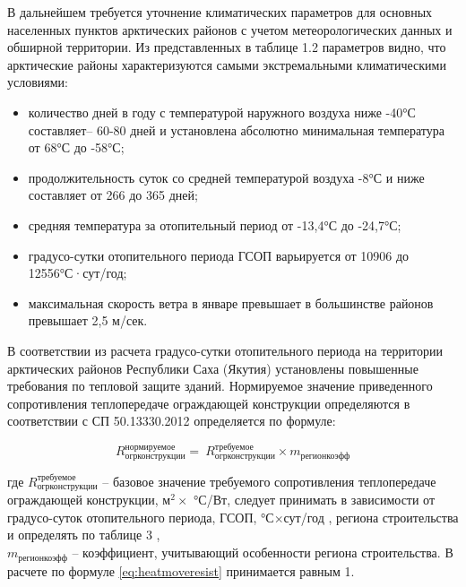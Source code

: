 В дальнейшем требуется уточнение климатических параметров для основных населенных пунктов арктических районов с учетом метеорологических данных и обширной территории.
Из представленных в таблице 1.2 параметров видно, что арктические районы характеризуются самыми экстремальными климатическими условиями:
\begin{itemize}
    \item количество дней в году с температурой наружного воздуха ниже -40°С составляет– 60-80 дней и установлена абсолютно минимальная температура от 68°С до -58°С;  
    \item продолжительность суток со средней температурой воздуха -8°С и ниже составляет от 266 до 365 дней;
    \item средняя температура за отопительный период от -13,4°С до -24,7°С;
    \item градусо-сутки отопительного периода ГСОП варьируется от 10906 до 12556°С·сут/год;
    \item максимальная скорость ветра в январе превышает в большинстве районов превышает 2,5 м/сек.
\end{itemize}

В соответствии \Code{[5]} из расчета градусо-сутки отопительного периода на территории арктических районов Республики Саха (Якутия)
установлены повышенные требования по тепловой защите зданий. Нормируемое значение приведенного сопротивления теплопередаче ограждающей конструкции определяются
в соответствии с СП 50.13330.2012 \Code{[5]} определяется по формуле:

\begin{eqndesc}
    \begin{equation}\label{eq:heatmoveresist}
        R_\text{огрконструкции}^\text{нормируемое}=\ R_\text{огрконструкции}^\text{требуемое}\times m_\text{регионкоэфф}
    \end{equation}

    где $R_\text{огрконструкции}^\text{требуемое}$ -- базовое значение требуемого сопротивления теплопередаче ограждающей конструкции, м$^2 \times$ °С\slash Вт, следует принимать в зависимости от градусо-суток отопительного периода, ГСОП, °С$\times$сут\slash год , региона строительства и определять по таблице 3 \Code{[5]}, \\
    $m_\text{регионкоэфф}$ -- коэффициент, учитывающий особенности региона строительства. В расчете по формуле \eqref{eq:heatmoveresist} принимается равным 1.
\end{eqndesc}


